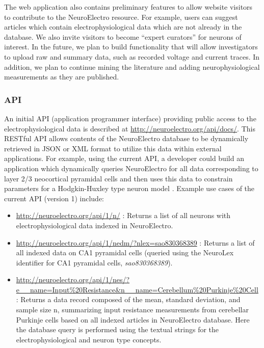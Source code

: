 \documentclass{template/frontiersSCNS} %
\begin{document}
The web application also contains preliminary features to allow website visitors to contribute to the NeuroElectro resource.  
For example, users can suggest articles which contain electrophysiological data which are not already in the database.  
We also invite visitors to become ``expert curators'' for neurons of interest.  
In the future, we plan to build functionality that will allow investigators to upload raw and summary data, such as recorded voltage and current traces.  
In addition, we plan to continue mining the literature and adding neurophysiological measurements as they are published.

\subsubsection{API}
An initial API (application programmer interface) providing public access to the electrophysiological data is described at \url{http://neuroelectro.org/api/docs/}.  
This RESTful API allows contents of the NeuroElectro database to be dynamically retrieved in JSON or XML format to utilize this data within external applications.  
For example, using the current API, a developer could build an application which dynamically queries NeuroElectro for all data corresponding to layer 2/3 neocortical pyramidal cells and then uses this data to constrain parameters for a Hodgkin-Huxley type neuron model \citep{hodgkin_quantitative_1952}.  
Example use cases of the current API (version 1) include:

\begin{itemize}
\item \url{http://neuroelectro.org/api/1/n/} : Returns a list of all neurons with electrophysiological data indexed in NeuroElectro.
\item \url{http://neuroelectro.org/api/1/nedm/?nlex=sao830368389} : Returns a list of all indexed data on CA1 pyramidal cells (queried using the NeuroLex identifier for CA1 pyramidal cells, \emph{sao830368389}).  
\item \url{http://neuroelectro.org/api/1/nes/?e__name=Input%20Resistance&n__name=Cerebellum%20Purkinje%20Cell} : Returns a data record composed of the mean, standard deviation, and sample size n, summarizing input resistance measurements from cerebellar Purkinje cells based on all indexed articles in NeuroElectro database.  
Here the database query is performed using the textual strings for the electrophysiological and neuron type concepts.
\end{itemize}
\end{document}
